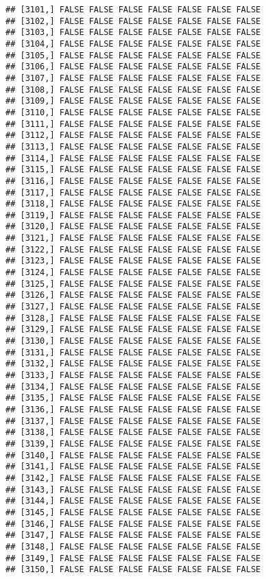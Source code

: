 \documentclass[
]{article}
\begin{document}
\begin{verbatim}
## [3101,] FALSE FALSE FALSE FALSE FALSE FALSE FALSE
## [3102,] FALSE FALSE FALSE FALSE FALSE FALSE FALSE
## [3103,] FALSE FALSE FALSE FALSE FALSE FALSE FALSE
## [3104,] FALSE FALSE FALSE FALSE FALSE FALSE FALSE
## [3105,] FALSE FALSE FALSE FALSE FALSE FALSE FALSE
## [3106,] FALSE FALSE FALSE FALSE FALSE FALSE FALSE
## [3107,] FALSE FALSE FALSE FALSE FALSE FALSE FALSE
## [3108,] FALSE FALSE FALSE FALSE FALSE FALSE FALSE
## [3109,] FALSE FALSE FALSE FALSE FALSE FALSE FALSE
## [3110,] FALSE FALSE FALSE FALSE FALSE FALSE FALSE
## [3111,] FALSE FALSE FALSE FALSE FALSE FALSE FALSE
## [3112,] FALSE FALSE FALSE FALSE FALSE FALSE FALSE
## [3113,] FALSE FALSE FALSE FALSE FALSE FALSE FALSE
## [3114,] FALSE FALSE FALSE FALSE FALSE FALSE FALSE
## [3115,] FALSE FALSE FALSE FALSE FALSE FALSE FALSE
## [3116,] FALSE FALSE FALSE FALSE FALSE FALSE FALSE
## [3117,] FALSE FALSE FALSE FALSE FALSE FALSE FALSE
## [3118,] FALSE FALSE FALSE FALSE FALSE FALSE FALSE
## [3119,] FALSE FALSE FALSE FALSE FALSE FALSE FALSE
## [3120,] FALSE FALSE FALSE FALSE FALSE FALSE FALSE
## [3121,] FALSE FALSE FALSE FALSE FALSE FALSE FALSE
## [3122,] FALSE FALSE FALSE FALSE FALSE FALSE FALSE
## [3123,] FALSE FALSE FALSE FALSE FALSE FALSE FALSE
## [3124,] FALSE FALSE FALSE FALSE FALSE FALSE FALSE
## [3125,] FALSE FALSE FALSE FALSE FALSE FALSE FALSE
## [3126,] FALSE FALSE FALSE FALSE FALSE FALSE FALSE
## [3127,] FALSE FALSE FALSE FALSE FALSE FALSE FALSE
## [3128,] FALSE FALSE FALSE FALSE FALSE FALSE FALSE
## [3129,] FALSE FALSE FALSE FALSE FALSE FALSE FALSE
## [3130,] FALSE FALSE FALSE FALSE FALSE FALSE FALSE
## [3131,] FALSE FALSE FALSE FALSE FALSE FALSE FALSE
## [3132,] FALSE FALSE FALSE FALSE FALSE FALSE FALSE
## [3133,] FALSE FALSE FALSE FALSE FALSE FALSE FALSE
## [3134,] FALSE FALSE FALSE FALSE FALSE FALSE FALSE
## [3135,] FALSE FALSE FALSE FALSE FALSE FALSE FALSE
## [3136,] FALSE FALSE FALSE FALSE FALSE FALSE FALSE
## [3137,] FALSE FALSE FALSE FALSE FALSE FALSE FALSE
## [3138,] FALSE FALSE FALSE FALSE FALSE FALSE FALSE
## [3139,] FALSE FALSE FALSE FALSE FALSE FALSE FALSE
## [3140,] FALSE FALSE FALSE FALSE FALSE FALSE FALSE
## [3141,] FALSE FALSE FALSE FALSE FALSE FALSE FALSE
## [3142,] FALSE FALSE FALSE FALSE FALSE FALSE FALSE
## [3143,] FALSE FALSE FALSE FALSE FALSE FALSE FALSE
## [3144,] FALSE FALSE FALSE FALSE FALSE FALSE FALSE
## [3145,] FALSE FALSE FALSE FALSE FALSE FALSE FALSE
## [3146,] FALSE FALSE FALSE FALSE FALSE FALSE FALSE
## [3147,] FALSE FALSE FALSE FALSE FALSE FALSE FALSE
## [3148,] FALSE FALSE FALSE FALSE FALSE FALSE FALSE
## [3149,] FALSE FALSE FALSE FALSE FALSE FALSE FALSE
## [3150,] FALSE FALSE FALSE FALSE FALSE FALSE FALSE

\end{verbatim}
\end{document}
